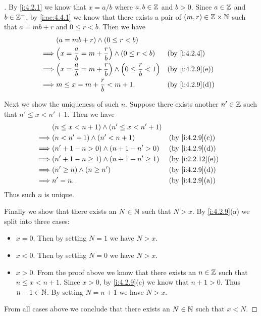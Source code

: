 \begin{proof}[]
  By \cref{i:4.2.1} we know that \(x = a / b\) where \(a, b \in \mathbb{Z}\) and \(b > 0\).
  Since \(a \in \mathbb{Z}\) and \(b \in \mathbb{Z}^+\), by \cref{i:ac:4.4.1} we know that there exists a pair of \((m, r) \in \mathbb{Z} \times \mathbb{N}\) such that \(a = mb + r\) and \(0 \leq r < b\).
  Then we have
  \begin{align*}
             & (a = mb + r) \land (0 \leq r < b)                                                                \\
    \implies & \pa{x = \dfrac{a}{b} = m + \dfrac{r}{b}} \land (0 \leq r < b)               &  & \by{i:4.2.4}    \\
    \implies & \pa{x = \dfrac{a}{b} = m + \dfrac{r}{b}} \land \pa{0 \leq \dfrac{r}{b} < 1} &  & \by{i:4.2.9}[e] \\
    \implies & m \leq x = m + \dfrac{r}{b} < m + 1.                                        &  & \by{i:4.2.9}[d]
  \end{align*}

  Next we show the uniqueness of such \(n\).
  Suppose there exists another \(n' \in \mathbb{Z}\) such that \(n' \leq x < n' + 1\).
  Then we have
  \begin{align*}
             & (n \leq x < n + 1) \land (n' \leq x < n' + 1)                       \\
    \implies & (n < n' + 1) \land (n' < n + 1)               &  & \by{i:4.2.9}[c]  \\
    \implies & (n' + 1 - n > 0) \land (n + 1 - n' > 0)       &  & \by{i:4.2.9}[d]  \\
    \implies & (n' + 1 - n \geq 1) \land (n + 1 - n' \geq 1) &  & \by{i:2.2.12}[e] \\
    \implies & (n' \geq n) \land (n \geq n')                 &  & \by{i:4.2.9}[d]  \\
    \implies & n' = n.                                       &  & \by{i:4.2.9}[a]
  \end{align*}
  Thus such \(n\) is unique.

  Finally we show that there exists an \(N \in \mathbb{N}\) such that \(N > x\).
  By \cref{i:4.2.9}(a) we split into three cases:
  \begin{itemize}
    \item \(x = 0\).
          Then by setting \(N = 1\) we have \(N > x\).
    \item \(x < 0\).
          Then by setting \(N = 0\) we have \(N > x\).
    \item \(x > 0\).
          From the proof above we know that there exists an \(n \in \mathbb{Z}\) such that \(n \leq x < n + 1\).
          Since \(x > 0\), by \cref{i:4.2.9}(c) we know that \(n + 1 > 0\).
          Thus \(n + 1 \in \mathbb{N}\).
          By setting \(N = n + 1\) we have \(N > x\).
  \end{itemize}
  From all cases above we conclude that there exists an \(N \in \mathbb{N}\) such that \(x < N\).
\end{proof}

